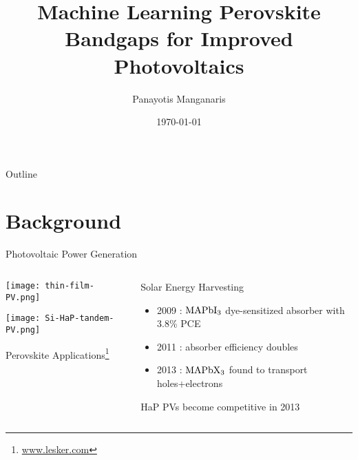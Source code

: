 \documentclass[10pt, aspectratio=169, presentation]{beamer}
\institute[Mannodi Group]{
\inst{1} Purdue Materials Engineering\\Professor Arun Mannodi-Kanakkithodi
}
\author{Panayotis Manganaris\inst{1}}
\date{\today}
\title{Machine Learning Perovskite Bandgaps for Improved Photovoltaics}
\begin{document}
\maketitle
\begin{frame}{Outline}
\tableofcontents
\end{frame}

\section{Background}
\label{sec:orgce13dd3}
\begin{frame}[label={sec:org90aa522}]{Photovoltaic Power Generation}
\begin{columns}
\begin{column}{0.3\columnwidth}
\begin{center}
\texttt{[image: thin-film-PV.png]}
\end{center}
\begin{center}
\texttt{[image: Si-HaP-tandem-PV.png]}
\end{center}

\tiny{}\center{}Perovskite Applications\footnote{\tiny{}\href{https://www.lesker.com/newweb/ped/applications/perovskite-research.cfm }{www.lesker.com}}
\end{column}
\begin{column}{0.7\columnwidth}
\begin{block}{Solar Energy Harvesting}
\begin{itemize}
\item 2009 : \(\ce{MAPbI_3}\) dye-sensitized absorber with 3.8\% PCE
\autocite{kojima-2009-organ-halid}
\item 2011 : absorber efficiency doubles
\autocite{im-2011}
\item 2013 : \(\ce{MAPbX_3}\) found to transport holes+electrons
\autocite{saliba-2014-influen-therm}
\end{itemize}


HaP PVs become competitive in 2013
\end{block}
\end{column}
\end{columns}
\end{frame}
\end{document}
